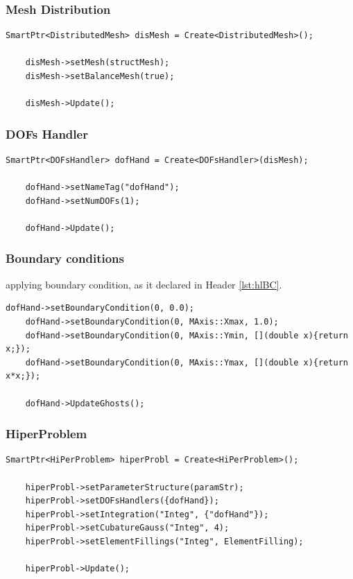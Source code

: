 \documentclass[]{article}
\begin{document}
\subsubsection{Mesh Distribution} \label{sec: mshD}
\begin{lstlisting}[firstnumber=47]
	SmartPtr<DistributedMesh> disMesh = Create<DistributedMesh>();
	
	disMesh->setMesh(structMesh);
	disMesh->setBalanceMesh(true);
	
	disMesh->Update();
\end{lstlisting}

\subsubsection{DOFs Handler} \label{sec: dofC}
\begin{lstlisting}[firstnumber=53]
	SmartPtr<DOFsHandler> dofHand = Create<DOFsHandler>(disMesh);
	
	dofHand->setNameTag("dofHand");
	dofHand->setNumDOFs(1);
	
	dofHand->Update();
\end{lstlisting}

\subsubsection{Boundary conditions} \label{sec: BC}
applying boundary condition, as it declared in Header \ref{lst:hlBC}.
\begin{lstlisting}[firstnumber=59]
	dofHand->setBoundaryCondition(0, 0.0); 
	dofHand->setBoundaryCondition(0, MAxis::Xmax, 1.0);
	dofHand->setBoundaryCondition(0, MAxis::Ymin, [](double x){return x;});
	dofHand->setBoundaryCondition(0, MAxis::Ymax, [](double x){return x*x;});
	
	dofHand->UpdateGhosts();
\end{lstlisting}

\subsubsection{HiperProblem} \label{sec: hpc}
\begin{lstlisting}[firstnumber=65]
	SmartPtr<HiPerProblem> hiperProbl = Create<HiPerProblem>();
	
	hiperProbl->setParameterStructure(paramStr);
	hiperProbl->setDOFsHandlers({dofHand});
	hiperProbl->setIntegration("Integ", {"dofHand"});
	hiperProbl->setCubatureGauss("Integ", 4);
	hiperProbl->setElementFillings("Integ", ElementFilling);
	
	hiperProbl->Update();
\end{lstlisting}
\end{document}
